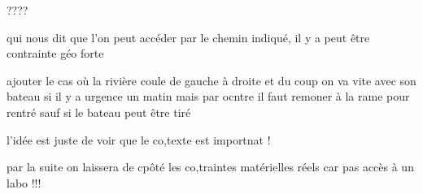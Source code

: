 ????

qui nous dit que l'on peut accéder par le chemin indiqué, il y a peut être contrainte géo forte


ajouter le cas où la rivière coule de gauche à droite et du coup on va vite avec son bateau si il y a urgence un matin mais par ocntre il faut remoner à la rame pour rentré sauf si le bateau peut être tiré


l'idée est juste de voir que le co,texte est importnat !


par la suite on laissera de cpôté les co,traintes matérielles réels car pas accès à un labo !!!